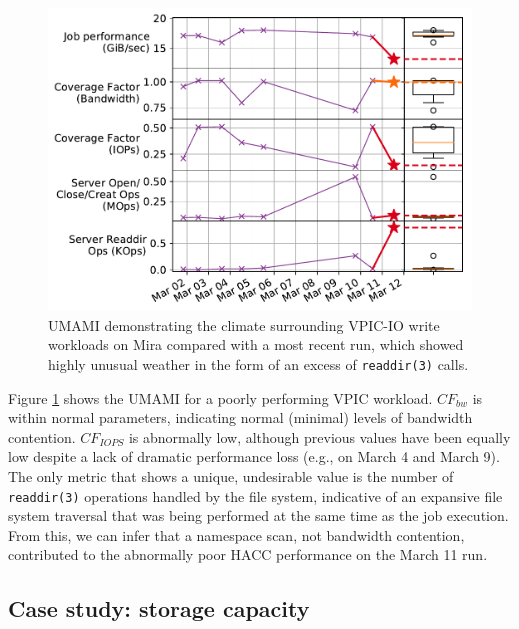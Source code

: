 \begin{figure}[t]
    \centering
    \includegraphics[width=1.0\columnwidth]{figs/umami-mira-fs1-vpic-write.pdf}
    \vspace{-.25in}
    \caption{UMAMI demonstrating the climate surrounding VPIC-IO write workloads on Mira compared with a most recent run, which showed highly unusual weather in the form of an excess of \texttt{readdir(3)} calls.
    }
    \label{fig:umami-mira-fs1-vpic-write}
	\vspace{-.15in}
\end{figure}

Figure \ref{fig:umami-mira-fs1-vpic-write} shows the UMAMI for a poorly performing VPIC workload.
$\mathit{CF}_{\mathit{bw}}$ is within normal parameters, indicating normal (minimal) levels of bandwidth contention.
$\mathit{CF}_{\mathit{IOPS}}$ is abnormally low, although previous values have been equally low despite a lack of dramatic performance loss (e.g., on March 4 and March 9).
The only metric that shows a unique, undesirable value is the number of \texttt{readdir(3)} operations handled by the file system, indicative of an expansive file system traversal that was being performed at the same time as the job execution.   From this, we can infer that a namespace scan, not bandwidth contention, contributed to the abnormally poor HACC performance on the March 11 run.

\subsection{Case study: storage capacity}

